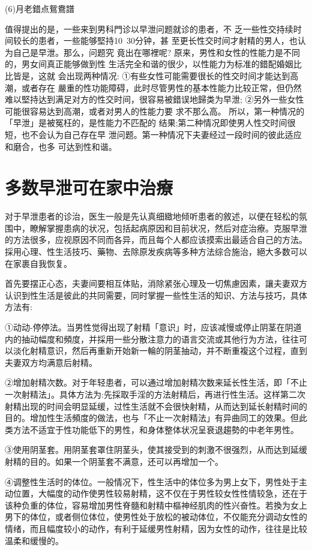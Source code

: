 \documentclass[12pt,UTF8]{ctexbook}
\begin{document}
(6)月老錯点鴛鴦譜

值得提出的是，一些来到男科門诊以早泄问题就诊的患者，不
乏一些性交持续时间较长的患者，一些能够堅持10~30分钟，甚
至更长性交时间才射精的男人，也认为自己是早泄。那么，问题究
竟出在哪裡呢?
原来，男性和女性的性能力是不同的，男女间真正能够做到性
生活完全和谐的很少，以性能力为标准的錯配婚姻比比皆是，这就
会出现两种情况:
①有些女性可能需要很长的性交时间才能达到高潮，或者存在
嚴重的性功能障碍，此时尽管男性的基本性能力比较正常，但仍然
难以堅持达到满足对方的性交时间，很容易被錯误地歸类为早泄;
②另外一些女性可能很容易达到高潮，或者对男人的性能力要
求不那么高。
所以，第一种情况的「早泄」是被冤枉的，是性能力不匹配的
结果;第二种情况即使男人性交时间很短，也不会认为自己存在早
泄问题。第一种情况下夫妻经过一段时间的彼此适应和磨合，也多
可达到性和谐。

\section{多数早泄可在家中治療}

对于早泄患者的诊治，医生一般是先认真细緻地倾听患者的敘述，以便在轻松的氛围中，瞭解掌握患病的状况，包括起病原因和目前状况，然后对症治療。克服早泄的方法很多，应视原因不同而各异，而且每个人都应该摸索出最适合自己的方法。採用心理、性生活技巧、藥物、去除原发疾病等多种方法综合施治，絕大多数可以在家裹自我恢复。

首先要摆正心态，夫妻间要相互体贴，消除紧张心理及一切焦慮因素，讓夫妻双方认识到性生活是彼此的共同需要，同时掌握一些性生活的知识、方法与技巧，具体方法有:

①动动-停停法。当男性觉得出现了射精「意识」时，应该减慢或停止阴茎在阴道内的抽动幅度和頻度，并採用一些分散注意力的语言交流或其他行为方法，往往可以淡化射精意识，然后再重新开始新一輪的阴茎抽动，并不断重複这个过程，直到夫妻双方均满意后射精。

②增加射精次数。对于年轻患者，可以通过增加射精次数来延长性生活，即「不止一次射精法」。具体方法为:先採取手淫的方法射精后，再进行性生活。这样第二次射精出现的时间会明显延缓，过性生活就不会很快射精，从而达到延长射精时间的目的。增加性生活頻度的做法，也与「不止一次射精法」有异曲同工的效果。但此类方法不适宜于性功能低下的男性，和身体整体状况呈衰退趨勢的中老年男性。

③使用阴茎套。用阴茎套罩住阴茎头，使其接受到的刺激不很强烈，从而达到延缓射精的目的。如果一个阴茎套不满意，还可以再增加一个。

④调整性生活时的体位。一般情况下，性生活中的体位多为男上女下，男性处于主动位置，大幅度的动作使男性较易射精，这不仅在于男性较女性性情较急，还在于该种负重的体位，容易增加男性脊髓和射精中樞神经肌肉的性兴奋性。若換为女上男下的体位，或者侧位体位，使男性处于放松的被动体位，不仅能充分调动女性的情绪，而且幅度较小的动作，有利于延缓男性射精，因为女性的动作，往往是比较温柔和缓慢的。
\end{document}
